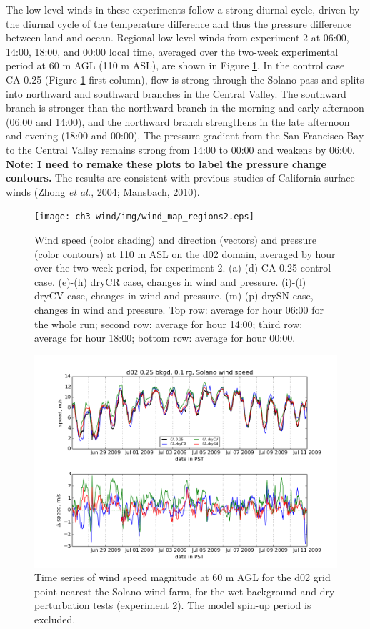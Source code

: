The low-level winds in these experiments follow a strong diurnal cycle, driven by the diurnal cycle of the temperature difference and thus the pressure difference between land and ocean.  Regional low-level winds from experiment 2 at 06:00, 14:00, 18:00, and 00:00 local time, averaged over the two-week experimental period at 60 m AGL (110 m ASL), are shown in Figure \ref{fig:windSol_WindMapsRg}.  In the control case CA-0.25 (Figure \ref{fig:windSol_WindMapsRg} first column), flow is strong through the Solano pass and splits into northward and southward branches in the Central Valley.  The southward branch is stronger than the northward branch in the morning and early afternoon (06:00 and 14:00), and the northward branch strengthens in the late afternoon and evening (18:00 and 00:00).  The pressure gradient from the San Francisco Bay to the Central Valley remains strong from 14:00 to 00:00 and weakens by 06:00.  \textbf{Note: I need to remake these plots to label the pressure change contours.}   The results are consistent with previous studies of California surface winds (Zhong \textit{et al.}, 2004; Mansbach, 2010).

\begin{figure}[here]
\texttt{[image: ch3-wind/img/wind\_map\_regions2.eps]}
\caption{Wind speed (color shading) and direction (vectors) and pressure (color contours) at 110 m ASL on the d02 domain, averaged by hour over the two-week period, for experiment 2.  (a)-(d) CA-0.25 control case.  (e)-(h) dryCR case, changes in wind and pressure.  (i)-(l) dryCV case, changes in wind and pressure.  (m)-(p) drySN case, changes in wind and pressure.  Top row: average for hour 06:00 for the whole run; second row: average for hour 14:00; third row: average for hour 18:00; bottom row: average for hour 00:00.}
\label{fig:windSol_WindMapsRg}
\end{figure}

\begin{figure}[here]
\includegraphics[width=1\textwidth]{ch3-wind/img/solano_wind_wetbkd_dryrg_d02_level0.png}
\caption{Time series of wind speed magnitude at 60 m AGL for the d02 grid point nearest the Solano wind farm, for the wet background and dry perturbation tests (experiment 2).  The model spin-up period is excluded.}
\label{fig:windSol_TseriesDryRg}
\end{figure}

